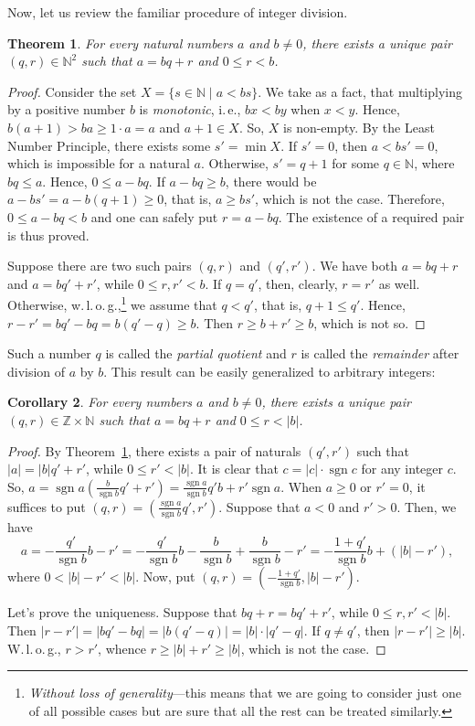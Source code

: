 \documentclass[12pt,notitlepage]{article}
\theoremstyle{plain}
\newtheorem{thm}{Theorem}[section]
\newtheorem{corr}[thm]{Corollary}
\theoremstyle{definition}
\theoremstyle{plain}
\newcommand{\N}{\mathbb{N}}
\newcommand{\Z}{\mathbb{Z}}
\newcommand{\1}{\mathbf{1}}
\newcommand{\0}{\mathbf{0}}
\DeclareMathOperator{\sgn}{sgn}
\begin{document}
Now, let us review the familiar procedure of integer division.
\begin{thm}\label{L4:t3}
For every natural numbers $a$ and $b \neq 0$, there exists a unique pair $(q,r) \in \N^2$ such that
$a = b q + r $ and $0 \leq r < b$.
\end{thm}
\begin{proof}
Consider the set $X = \{ s \in \N \mid a < b s \}$. We take as a fact, that multiplying by a positive number $b$ is \emph{monotonic}, i.\,e., $b x < b y$ when $x < y$. Hence, $b (a + 1) > b a \geq  1 \cdot a = a$ and $a + 1 \in X$. So, $X$ is non-empty. By the Least Number Principle, there exists some $s' = \min X$. If $s' = 0$, then $a < bs' = 0$, which is impossible for a natural $a$. Otherwise, $s' = q + 1$ for some $q \in \N$, where $b q \leq a$. Hence, $0 \leq a - bq$. If $a - bq \geq b$, there would be $a - bs' = a - b(q + 1)  \geq 0$, that is, $a \geq bs'$, which is not the case. Therefore, $0 \leq a - bq < b$ and one can safely put $r = a - bq$. The existence of a required pair is thus proved.

Suppose there are two such pairs $(q,r)$ and $(q',r')$. We have both $a = b q + r$ and $a = b q' + r'$, while $0 \leq r, r' < b$. If $q = q'$, then, clearly, $r = r'$ as well. Otherwise, w.\,l.\,o.\,g.,\footnote{\emph{Without loss of generality}---this means that we are going to consider just one of all possible cases but are sure that all the rest can be treated similarly.} we assume that $q < q'$, that is, $q + 1 \leq q'$. Hence, $r - r' = b q' - b q = b (q' - q) \geq b$. Then $r \geq b + r' \geq b$, which is not so.
\end{proof}
Such a number $q$ is called the \emph{partial quotient} and $r$ is called the \emph{remainder} after division of $a$ by $b$. This result can be easily generalized to arbitrary integers:
\begin{corr}\label{L4:c4}
For every numbers $a$ and $b \neq 0$, there exists a unique pair $(q,r) \in \Z \times \N$ such that
$a = b q + r $ and $0 \leq r < |b|$.
\end{corr}
\begin{proof}
By Theorem~\ref{L4:t3}, there exists a pair of naturals $(q',r')$ such that $|a| = |b| q' + r'$, while $0 \leq r' < |b|$. It is clear that $c = |c| \cdot \sgn c$ for any integer $c$. So,
$a = \sgn a (\frac{b}{\sgn b} q' + r') = \frac{\sgn a}{\sgn b} q' b + r' \sgn a$. When $a \geq 0$ or $r' = 0$, it suffices to put $(q, r) = (\frac{\sgn a}{\sgn b} q', r')$. Suppose that $a < 0$ and $r' > 0$. Then, we have
$$a = -\frac{q'}{\sgn b} b - r' = -\frac{q'}{\sgn b} b - \frac{b}{\sgn b} + \frac{b}{\sgn b} - r' = -\frac{1 +q'}{\sgn b} b + (|b| - r'),$$
where $0 < |b| - r' < |b|$. Now, put $(q,r) = (-\frac{1 + q'}{\sgn b} , |b| - r')$.

Let's prove the uniqueness. Suppose that $b q + r = b q' + r'$, while $0 \leq r, r' < |b|$. Then $|r - r'| = |b q' - b q| = |b (q' - q)| = |b| \cdot |q' - q|$. If $q \neq q'$, then $|r - r'| \geq |b|$. W.\,l.\,o.\,g., $r > r'$, whence $r \geq |b| + r' \geq |b|$, which is not the case.
\end{proof}
\end{document}
